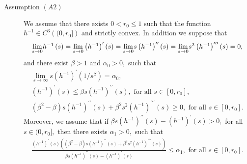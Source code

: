 \documentclass[11pt,reqno]{amsart}
\theoremstyle{plain}
\numberwithin{equation}{section}
\numberwithin{equation}{section}
\begin{document}
\begin{description}
\item[Assumption $\left( A2\right) $] We assume that there exists $%
0<r_{0}\leq 1$ such that the function $h^{-1}\in C^{3}\left(
(0,r_{0}]\right) $ and strictly convex. In addition we suppose that 
\begin{equation}
\begin{array}{c}
\underset{s\rightarrow 0}{\lim }h^{-1}\left( s\right) =\underset{%
s\rightarrow 0}{\lim }\left( h^{-1}\right) ^{\prime }\left( s\right) =%
\underset{s\rightarrow 0}{\lim }s\left( h^{-1}\right) ^{\prime \prime
}\left( s\right) =\underset{s\rightarrow 0}{\lim }s^{2}\left( h^{-1}\right)
^{\prime \prime \prime }\left( s\right) =0,%
\end{array}
\label{assumption1}
\end{equation}%
and there exist $\beta >1$ and $\alpha _{0}>0,$ such that 
\begin{equation}
\begin{array}{l}
\underset{s\rightarrow \infty }{\lim }s\left( h^{-1}\right) ^{\prime }\left(
1/s^{\beta }\right) =\alpha _{0}, \\ 
\left( h^{-1}\right) ^{\prime }\left( s\right) \leq \beta s\left(
h^{-1}\right) ^{\prime \prime }\left( s\right) ,\text{ for all }s\in \left[
0,r_{0}\right] , \\ 
\left( \beta ^{2}-\beta \right) s\left( h^{-1}\right) ^{\prime \prime
}\left( s\right) +\beta ^{2}s^{2}\left( h^{-1}\right) ^{\prime \prime \prime
}\left( s\right) \geq 0,\text{ for all }s\in \left[ 0,r_{0}\right] .%
\end{array}
\label{assumption2}
\end{equation}%
Moreover, we assume that if $\beta s\left( h^{-1}\right) ^{\prime \prime
}\left( s\right) -\left( h^{-1}\right) ^{\prime }\left( s\right) >0,$ for
all $s\in (0,r_{0}],$ then there exists $\alpha _{1}>0,$ such that%
\begin{equation}
\begin{array}{c}
\frac{\left( h^{-1}\right) ^{\prime }\left( s\right) \left( \left( \beta
^{2}-\beta \right) s\left( h^{-1}\right) ^{\prime \prime }\left( s\right)
+\beta ^{2}s^{2}\left( h^{-1}\right) ^{\prime \prime \prime }\left( s\right)
\right) }{\beta s\left( h^{-1}\right) ^{\prime \prime }\left( s\right)
-\left( h^{-1}\right) ^{\prime }\left( s\right) }\leq \alpha _{1},\text{ for
all }s\in \left[ 0,r_{0}\right] .%
\end{array}
\label{assumption3}
\end{equation}
\end{description}
\end{document}

